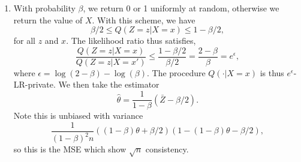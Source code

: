 \begin{enumerate}[label=(\alph*)]
\item
  With probability $\beta$, we return 0 or 1 uniformly at random, otherwise we return the value of $X$. With this scheme, we have 
  \[\beta/2 \le Q(Z = z | X = x) \le 1-\beta / 2,\] 
  for all $z$ and $x$. The likelihood ratio thus satisfies,
  \[\frac{Q(Z=z|X=x)}{Q(Z=z|X=x')} \le \frac{1-\beta/2}{\beta/2} = \frac{2-\beta}{\beta} = e^\epsilon, \]
  where $\epsilon = \log(2-\beta) - \log(\beta)$. The procedure $Q(\cdot |X=x)$ is thus $e^\epsilon$-LR-private. We then take the estimator 
  \[ \hat\theta = \frac{1}{1-\beta} (\bar{Z}-\beta/2).\] 
  Note this is unbiased with variance \[\frac{1}{(1-\beta)^2 n} ((1-\beta)\theta + \beta/2)(1 - (1- \beta) \theta - \beta/2),\] so this is the MSE which show $\sqrt{n}$ consistency.


\end{enumerate}

